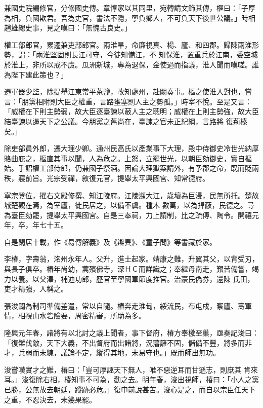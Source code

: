 \begin{pinyinscope}
 兼國史院編修官，分修國史傳。章惇家以其同里，宛轉請文飾其傳，樞曰：「子厚為相，負國欺君。吾為史官，書法不隱，寧負鄉人，不可負天下後世公議。」時相趙雄總史事，見之嘆曰：「無愧古良史。」



 權工部郎官，累遷兼吏部郎官。兩淮旱，命廉視真、楊、廬、和四郡。歸陳兩淮形勢，謂：「兩淮堅固則長江可守，今徒知備江，不
 知保淮，置重兵於江南，委空城於淮上，非所以戒不虞。瓜洲新城，專為退保，金使過而指議，淮人聞而嘆嗟。誰為陛下建此策也？」



 遷軍器少監，除提舉江東常平茶鹽，改知處州，赴闕奏事。樞之使淮入對也，嘗言：「朋黨相附則大臣之權重，言路壅塞則人主之勢孤。」時宰不悅。至是又言：「威權在下則主勢弱，故大臣逐臺諫以蔽人主之聰明；威權在上則主勢強，故大臣結臺諫以遏天下之公議。今朋黨之舊尚在，臺諫之官未正紀綱，言路將
 復荊榛矣。」



 除吏部員外郎，遷大理少卿。通州民高氏以產業事下大理，殿中侍御史冷世光納厚賂曲庇之，樞直其事以聞，人為危之。上怒，立罷世光，以朝臣劾御史，實自樞始。手詔權工部侍郎，仍兼國子祭酒。因論大理獄案請外，有予郡之命，既而貶兩秩，寢前旨。光宗受禪，敘復元官，提舉太平興國宮、知常德府。



 寧宗登位，擢右文殿修撰、知江陵府。江陵瀕大江，歲壞為巨浸，民無所托。楚故城楚觀在焉，為室廬，徙民居之，以備不虞。種木
 數萬，以為捍蔽，民德之。尋為臺臣劾罷，提舉太平興國宮。自是三奉祠，力上請制，比之疏傅、陶令。開禧元年，卒，年七十五。



 自是閑居十載，作《易傳解義》及《辯異》、《童子問》等書藏於家。



 李椿，字壽翁，洺州永年人。父升，進士起家。靖康之難，升翼其父，以背受刃，與長子俱卒。椿年尚幼，蒿殯佛寺，深ＨＣ而詳識之；奉繼母南走，艱苦備嘗，竭力以養。以父澤，補迪功郎，歷官至寧國軍節度推官。治豪民偽券，還陳
 氏田，吏才精強，人稱之。



 張浚闢為制司準備差遣，常以自隨。椿奔走淮甸，綏流民，布屯戍，察廬、壽軍情，相視山水砦險要，周密精審，所助為多。



 隆興元年春，諸將有以北討之議上聞者，事下督府，椿方奉檄至巢，亟奏記浚曰：「復讎伐敵，天下大義，不出督府而出諸將，況藩籬不固，儲備不豐，將多而非才，兵弱而未練，議論不定，縱得其地，未易守也。」既而師出無功。



 浚嘗嘆實才之難，椿曰：「豈可厚誣天下無人，唯不惡逆耳而甘遜志，則庶其
 肯來耳。」浚復除右相，椿知事不可為，勸之去。明年春，浚出視師，椿曰：「小人之黨已勝，公無故去朝廷，蹤跡必危。」復申前說甚苦。浚心是之，而自以宗臣任天下之重，不忍決去，未幾果罷。




\end{pinyinscope}
